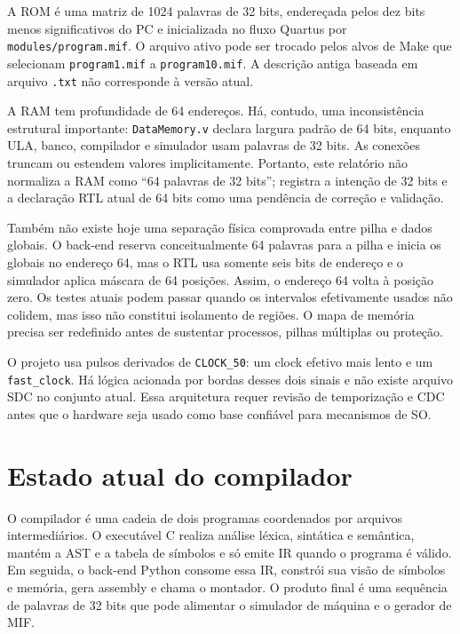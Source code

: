 \documentclass[
  12pt,
  oneside,
  a4paper,
  english,
  french,
  spanish,
  brazilian,
]{abntex2}
\begin{document}
A ROM é uma matriz de 1024 palavras de 32 bits, endereçada pelos dez bits menos significativos do PC e inicializada no fluxo Quartus por \texttt{modules/program.mif}. O arquivo ativo pode ser trocado pelos alvos de Make que selecionam \texttt{program1.mif} a \texttt{program10.mif}. A descrição antiga baseada em arquivo \texttt{.txt} não corresponde à versão atual.

A RAM tem profundidade de 64 endereços. Há, contudo, uma inconsistência estrutural importante: \texttt{DataMemory.v} declara largura padrão de 64 bits, enquanto ULA, banco, compilador e simulador usam palavras de 32 bits. As conexões truncam ou estendem valores implicitamente. Portanto, este relatório não normaliza a RAM como ``64 palavras de 32 bits''; registra a intenção de 32 bits e a declaração RTL atual de 64 bits como uma pendência de correção e validação.

Também não existe hoje uma separação física comprovada entre pilha e dados globais. O back-end reserva conceitualmente 64 palavras para a pilha e inicia os globais no endereço 64, mas o RTL usa somente seis bits de endereço e o simulador aplica máscara de 64 posições. Assim, o endereço 64 volta à posição zero. Os testes atuais podem passar quando os intervalos efetivamente usados não colidem, mas isso não constitui isolamento de regiões. O mapa de memória precisa ser redefinido antes de sustentar processos, pilhas múltiplas ou proteção.

O projeto usa pulsos derivados de \texttt{CLOCK\_50}: um clock efetivo mais lento e um \texttt{fast\_clock}. Há lógica acionada por bordas desses dois sinais e não existe arquivo SDC no conjunto atual. Essa arquitetura requer revisão de temporização e CDC antes que o hardware seja usado como base confiável para mecanismos de SO.

\chapter{Estado atual do compilador}
\label{cap:compilador}

O compilador é uma cadeia de dois programas coordenados por arquivos intermediários. O executável C realiza análise léxica, sintática e semântica, mantém a AST e a tabela de símbolos e só emite IR quando o programa é válido. Em seguida, o back-end Python consome essa IR, constrói sua visão de símbolos e memória, gera assembly e chama o montador. O produto final é uma sequência de palavras de 32 bits que pode alimentar o simulador de máquina e o gerador de MIF.
\end{document}
